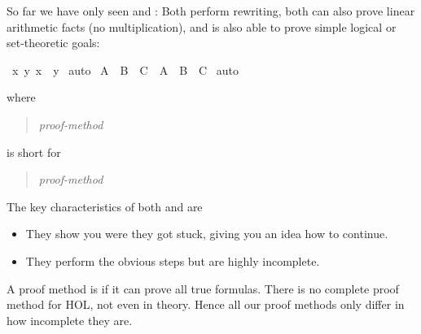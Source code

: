 \begin{isabellebody}
\begin{isamarkuptext}
So far we have only seen  and : Both perform
rewriting, both can also prove linear arithmetic facts (no multiplication),
and  is also able to prove simple logical or set-theoretic goals:%
\end{isamarkuptext}%
\isamarkuptrue%
\isamarkupfalse%
\ {}{}x{}\ {}y{}\ x\ {}\ y{}\isanewline
%
\isadelimproof
%
\endisadelimproof
%
\isatagproof
{}\isamarkupfalse%
\ auto%
\endisatagproof
{\isafoldproof}%
%
\isadelimproof
\isanewline
%
\endisadelimproof
\isanewline
{}\isamarkupfalse%
\ {}A\ {}\ B\ {}\ C\ {}\ A\ {}\ B\ {}\ C{}\isanewline
%
\isadelimproof
%
\endisadelimproof
%
\isatagproof
{}\isamarkupfalse%
\ auto%
\endisatagproof
{\isafoldproof}%
%
\isadelimproof
%
\endisadelimproof
%
\begin{isamarkuptext}%
where
\begin{quote}
 \textit{proof-method}
\end{quote}
is short for
\begin{quote}
 \textit{proof-method}\\
\end{quote}
The key characteristics of both  and  are
\begin{itemize}
\item They show you were they got stuck, giving you an idea how to continue.
\item They perform the obvious steps but are highly incomplete.
\end{itemize}
A proof method is  if it can prove all true formulas.
There is no complete proof method for HOL, not even in theory.
Hence all our proof methods only differ in how incomplete they are.


\end{isamarkuptext}
\end{isabellebody}
